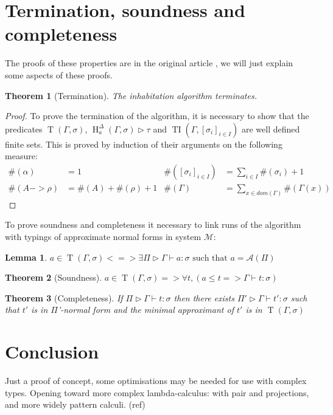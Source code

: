 \documentclass{article}
\DeclareMathOperator{\iT}{T}
\DeclareMathOperator{\iH}{H}
\DeclareMathOperator{\iTI}{TI}
\newtheorem*{Th*}{Theorem}
\newtheorem*{Lem*}{Lemma}
\def\sysm{system $\mathcal{M}$}
\begin{document}
\section{Termination, soundness and completeness}
The proofs of these properties are in the original article \cite{Kes}, we will just explain some aspects of these proofs.

\begin{Th*}[Termination]
    The inhabitation algorithm terminates.
\end{Th*}

\begin{proof}
    To prove the termination of the algorithm, it is necessary to show that the predicates $\iT(\Gamma, \sigma)$, $\iH^\Delta_a(\Gamma, \sigma) \triangleright \tau$ and $\iTI(\Gamma, [\sigma_i]_{i \in I})$ are well defined finite sets. This is proved by induction of their arguments on the following measure:
    \begin{align*}
    \#(\alpha) &= 1 & \#([\sigma_i]_{i\in I}) &= \textstyle \sum_{i\in I}\#(\sigma_i) +1
    \\ \#(A -> \rho) &= \#(A) + \#(\rho) + 1 & \#(\Gamma) &= \textstyle \sum_{x\in dom(\Gamma)} \#(\Gamma(x))
    \end{align*}
\end{proof}

 To prove soundness and completeness it necessary to link runs of the algorithm with typings of approximate normal forms in \sysm:
 \begin{Lem*}
 $a \in \iT(\Gamma, \sigma) <=> \exists\Pi\triangleright\Gamma\vdash a : \sigma \text{ such that } a = \mathcal{A}(\Pi)$
\end{Lem*}

\begin{Th*}[Soundness]
    $a \in \iT(\Gamma, \sigma) => \forall t, (a \leq t => \Gamma \vdash t : \sigma)$
\end{Th*}

\begin{Th*}[Completeness]
    If $\Pi \triangleright \Gamma \vdash t : \sigma$ then there exists $\Pi ' \triangleright \Gamma \vdash t' : \sigma$ such that $t'$ is in \emph{$\Pi$'-normal form} and the minimal approximant of $t'$ is in $\iT(\Gamma, \sigma)$
\end{Th*}
 


\section{Conclusion}
Just a proof of concept, some optimisations may be needed for use with complex types.
Opening toward more complex lambda-calculus: with pair and projections, and more widely pattern calculi. (ref)
\end{document}
